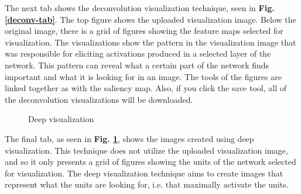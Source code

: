 \noindent The next tab shows the deconvolution visualization technique, seen in \textbf{Fig. \ref{deconv-tab}}. The top figure shows the uploaded visualization image. Below the original image, there is a grid of figures showing the feature maps selected for visualization. The visualizations show the pattern in the visualization image that was responsible for eliciting activations produced in a selected layer of the network. This pattern can reveal what a certain part of the network finds important and what it is looking for in an image. The tools of the figures are linked together as with the saliency map. Also, if you click the save tool, all of the deconvolution visualizations will be downloaded.\\

\begin{figure}[!h]
    \centering
        \caption{Deep visualization}
        \label{deepvis-tab}
\end{figure}

\noindent The final tab, as seen in \textbf{Fig. \ref{deepvis-tab}}, shows the images created using deep visualization. This technique does not utilize the uploaded visualization image, and so it only presents a grid of figures showing the units of the network selected for visualization. The deep visualization technique aims to create images that represent what the units are looking for, i.e. that maximally activate the units.


\cleardoublepage